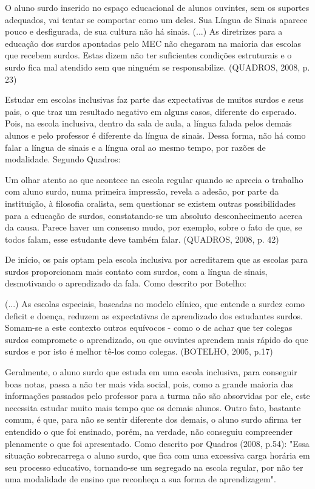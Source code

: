 \documentclass[brasil]{abnt}
\begin{document}
		\begin{citacao}O aluno surdo inserido no espaço educacional de alunos ouvintes, sem os suportes adequados, vai tentar se comportar como um deles. Sua Língua de Sinais aparece pouco e desfigurada, 
						de sua cultura não há sinais. (...) As diretrizes para a educação dos surdos apontadas pelo MEC não chegaram na maioria das escolas que recebem surdos. Estas dizem não ter suficientes 
						condições estruturais e o surdo fica mal atendido sem que ninguém se responsabilize. (QUADROS, 2008, p. 23)
		\end{citacao}
		
	Estudar em escolas inclusivas faz parte das expectativas de muitos surdos e seus pais, o que traz um resultado negativo em alguns casos, diferente do esperado.
	Pois, na escola inclusiva, dentro da sala de aula, a língua falada pelos demais alunos e pelo professor é diferente da língua de sinais. Dessa forma, não há como falar
	a língua de sinais e a língua oral ao mesmo tempo, por razões de modalidade. Segundo Quadros:
	
		\begin{citacao} Um olhar atento ao que acontece na escola regular quando se aprecia o trabalho com aluno surdo, numa primeira impressão, revela a adesão, por parte
						da instituição, à filosofia oralista, sem questionar se existem outras possibilidades para a educação de surdos, constatando-se um absoluto 
						desconhecimento acerca da causa. Parece haver um consenso mudo, por exemplo, sobre o fato de que, se todos falam, esse estudante deve também falar.
						(QUADROS, 2008, p. 42)
		\end{citacao}
	
	De início, os pais optam pela escola inclusiva por acreditarem que as escolas para surdos proporcionam mais contato com surdos, com a língua de sinais, desmotivando o
	aprendizado da fala. Como descrito por Botelho:
	
		\begin{citacao}(...) As escolas especiais, baseadas no modelo clínico, que entende a surdez como deficit e doença, reduzem as expectativas de aprendizado dos 
						estudantes surdos. Somam-se a este contexto outros equívocos - como o de achar que ter colegas surdos compromete o aprendizado, ou que ouvintes 
						aprendem mais rápido do que surdos e por isto é melhor tê-los como colegas. (BOTELHO, 2005, p.17)
		\end{citacao}
	
	Geralmente, o aluno surdo que estuda em uma escola inclusiva, para conseguir boas notas, passa a não ter mais vida social, pois, como a grande maioria das informações passados pelo professor para a turma não são absorvidas por ele, este necessita estudar
	muito mais tempo que os demais alunos.
	Outro fato, bastante comum, é
	que, para não se sentir diferente dos demais, o aluno surdo afirma ter entendido o que foi ensinado, porém, na verdade, não conseguiu compreender plenamente o que foi apresentado.
	Como descrito por Quadros (2008, p.54): "Essa situação sobrecarrega o aluno surdo, que fica com uma excessiva carga horária em seu processo educativo, tornando-se um segregado na 
	escola regular, por não ter uma modalidade de ensino que reconheça a sua forma de aprendizagem". 
	
\end{document}
